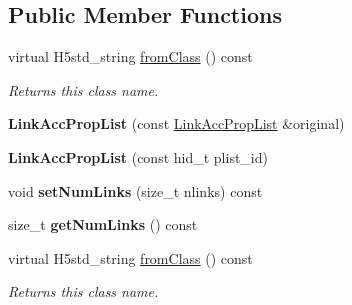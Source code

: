 \subsection*{Public Member Functions}
\begin{DoxyCompactItemize}
\item 
\mbox{\label{class_h5_1_1_link_acc_prop_list_ae3031353168d39a801fb7ffd59bc9c7b}} 
virtual H5std\+\_\+string \hyperlink{class_h5_1_1_link_acc_prop_list_ae3031353168d39a801fb7ffd59bc9c7b}{from\+Class} () const
\begin{DoxyCompactList}\small\item\em Returns this class name. \end{DoxyCompactList}\item 
\mbox{\label{class_h5_1_1_link_acc_prop_list_a97d0c5b7484bb34c10d46cdc7a8835b9}} 
{\bfseries Link\+Acc\+Prop\+List} (const \hyperlink{class_h5_1_1_link_acc_prop_list}{Link\+Acc\+Prop\+List} \&original)
\item 
\mbox{\label{class_h5_1_1_link_acc_prop_list_a8df333c1d568e0aec0c8cdd90cdd4382}} 
{\bfseries Link\+Acc\+Prop\+List} (const hid\+\_\+t plist\+\_\+id)
\item 
\mbox{\label{class_h5_1_1_link_acc_prop_list_a4c8db7173d759889d07010f1c8604985}} 
void {\bfseries set\+Num\+Links} (size\+\_\+t nlinks) const
\item 
\mbox{\label{class_h5_1_1_link_acc_prop_list_ac352ea2d96ffbff5dfbeec6f1c203166}} 
size\+\_\+t {\bfseries get\+Num\+Links} () const
\item 
\mbox{\label{class_h5_1_1_link_acc_prop_list_ae3031353168d39a801fb7ffd59bc9c7b}} 
virtual H5std\+\_\+string \hyperlink{class_h5_1_1_link_acc_prop_list_ae3031353168d39a801fb7ffd59bc9c7b}{from\+Class} () const
\begin{DoxyCompactList}\small\item\em Returns this class name. \end{DoxyCompactList}\item 
\mbox{\label{class_h5_1_1_link_acc_prop_list_a97d0c5b7484bb34c10d46cdc7a8835b9}} 

\end{DoxyCompactItemize}
